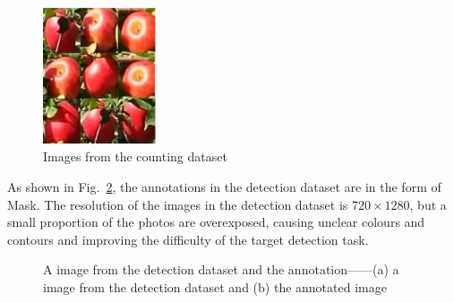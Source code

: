 \begin{figure}[htb]
    \centering
    \includegraphics[width=0.3\textwidth]{images/counting_dataset.png}
    \caption{Images from the counting dataset~\citep{Haeni2020}}
    \label{fig:counting dataset images}
\end{figure}

As shown in Fig.~\ref{fig:masked_detection_image}, the annotations in the detection dataset are in the form of Mask. The resolution of the images in the detection dataset is $720\times 1280$, but a small proportion of the photos are overexposed, causing unclear colours and contours and improving the difficulty of the target detection task.

\begin{figure}[htb]
    \centering
    \caption{A image from the detection dataset and the annotation——(a) a image from the detection dataset and (b) the annotated image}
    \label{fig:masked_detection_image}
\end{figure}



